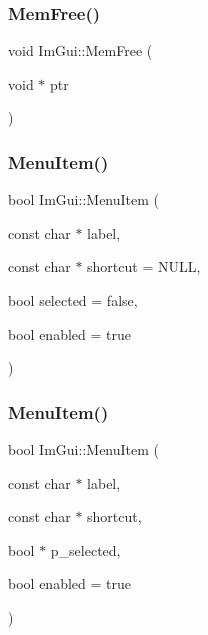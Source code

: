 \subsubsection{\texorpdfstring{Mem\+Free()}{MemFree()}}
{\footnotesize\ttfamily void Im\+Gui\+::\+Mem\+Free (\begin{DoxyParamCaption}\item[{void $\ast$}]{ptr }\end{DoxyParamCaption})}

\hypertarget{namespace_im_gui_aa1bae511ca47478998693a9d8c84f2e6}{}\label{namespace_im_gui_aa1bae511ca47478998693a9d8c84f2e6} 
\subsubsection{\texorpdfstring{Menu\+Item()}{MenuItem()}\hspace{0.1cm}{\footnotesize\ttfamily [1/2]}}
{\footnotesize\ttfamily bool Im\+Gui\+::\+Menu\+Item (\begin{DoxyParamCaption}\item[{const char $\ast$}]{label,  }\item[{const char $\ast$}]{shortcut = {\ttfamily NULL},  }\item[{bool}]{selected = {\ttfamily false},  }\item[{bool}]{enabled = {\ttfamily true} }\end{DoxyParamCaption})}

\hypertarget{namespace_im_gui_a237e76bff3088f1c2622f4aebae2356e}{}\label{namespace_im_gui_a237e76bff3088f1c2622f4aebae2356e} 
\subsubsection{\texorpdfstring{Menu\+Item()}{MenuItem()}\hspace{0.1cm}{\footnotesize\ttfamily [2/2]}}
{\footnotesize\ttfamily bool Im\+Gui\+::\+Menu\+Item (\begin{DoxyParamCaption}\item[{const char $\ast$}]{label,  }\item[{const char $\ast$}]{shortcut,  }\item[{bool $\ast$}]{p\+\_\+selected,  }\item[{bool}]{enabled = {\ttfamily true} }\end{DoxyParamCaption})}

